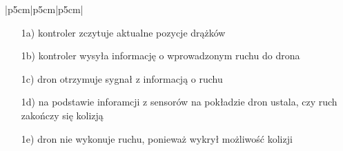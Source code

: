 \documentclass[12pt]{article}
\begin{document}
\begin{table}[H]
\begin{tabular}{|p{5cm}|p{5cm}|p{5cm}|}
{\begin{minipage}[t]{0.6\linewidth}
    \begin{enumerate}
        \item[1a)] kontroler zczytuje aktualne pozycje drążków
        \item[1b)] kontroler wysyła informację o wprowadzonym ruchu do drona
        \item[1c)] dron otrzymuje sygnał z informacją o ruchu
        \item[1d)] na podstawie inforamcji z sensorów na pokładzie dron ustala, czy ruch zakończy się kolizją
        \item[1e)] dron nie wykonuje ruchu, ponieważ wykrył możliwość kolizji
        \newline
    \end{enumerate}
\end{minipage}}\\
\hline
{}\\
\hline
\end{tabular}
\caption{Przypadek użycia: Wykonanie ruchu}
\label{tab:tabela_pu}
\end{table}
\end{document}
